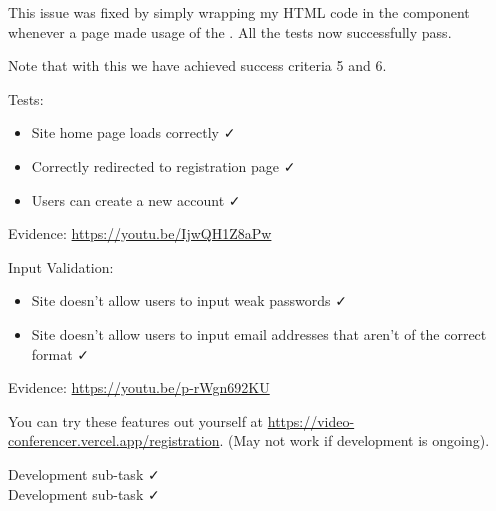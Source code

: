 This issue was fixed by simply wrapping my HTML code in the
 component whenever a page made usage of the
. All the tests now successfully pass. \\ \vspace{0.2cm}

Note that with this we have achieved success criteria 5 and 6. \\ \vspace{0.2cm}

{\color{gray} \hrulefill}
\vspace{0.2cm}

{\sffamily Tests:}
\begin{itemize}
  \item Site home page loads correctly \faCheck \\
  \item Correctly redirected to registration page \faCheck \\
  \item Users can create a new account \faCheck \\
\end{itemize}

{\sffamily Evidence: \url{https://youtu.be/IjwQH1Z8aPw}} \\ \vspace{0.2cm}

{\sffamily Input Validation:}
\begin{itemize}
  \item Site doesn't allow users to input weak passwords \faCheck \\
  \item Site doesn't allow users to input email addresses that aren't of the correct format \faCheck \\
\end{itemize}

{\sffamily Evidence: } \url{https://youtu.be/p-rWgn692KU}

{\color{gray} \hrulefill}
\vspace{0.2cm}

You can try these features out yourself at \url{https://video-conferencer.vercel.app/registration}.
(May not work if development is ongoing).\\ \vspace{0.2cm}

{\sffamily Development sub-task  \faCheck \\ \vspace{0.2cm}
Development sub-task  \faCheck } \\ \vspace{0.2cm}

